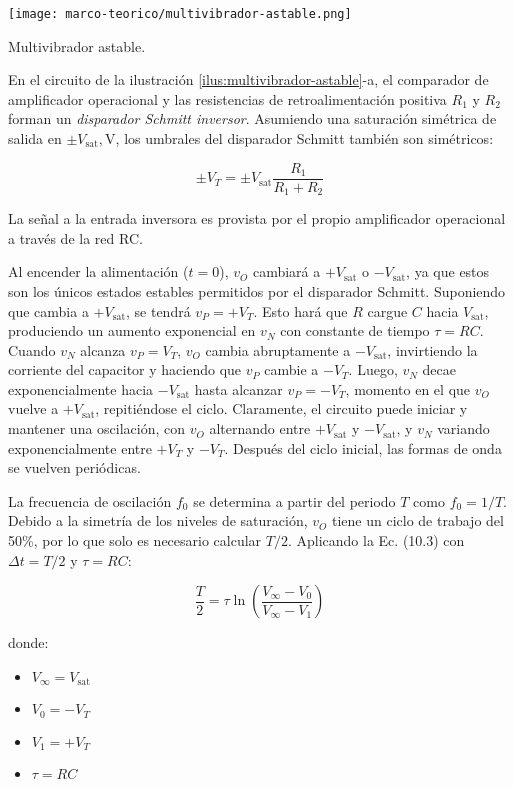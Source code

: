 \begin{ilustracion}[ht]
  \centering
  \texttt{[image: marco-teorico/multivibrador-astable.png]}
  \caption
  {Multivibrador astable.}
  \label{ilus:multivibrador-astable}
\end{ilustracion}

En el circuito de la ilustración \ref{ilus:multivibrador-astable}-a, el comparador de amplificador operacional y las resistencias de retroalimentación positiva \( R_1 \) y \( R_2 \) forman un \emph{disparador Schmitt inversor}. Asumiendo una saturación simétrica de salida en \(\pm V_{\text{sat}}, \text{V}\), los umbrales del disparador Schmitt también son simétricos:

\[
\pm V_T = \pm V_{\text{sat}} \frac{R_1}{R_1 + R_2} 
\]

La señal a la entrada inversora es provista por el propio amplificador operacional a través de la red RC.

Al encender la alimentación (\( t = 0 \)), \( v_O \) cambiará a \(+V_{\text{sat}}\) o \(-V_{\text{sat}}\), ya que estos son los únicos estados estables permitidos por el disparador Schmitt. Suponiendo que cambia a \(+V_{\text{sat}}\), se tendrá \( v_P = +V_T \). Esto hará que \( R \) cargue \( C \) hacia \( V_{\text{sat}} \), produciendo un aumento exponencial en \( v_N \) con constante de tiempo \( \tau = RC \). Cuando \( v_N \) alcanza \( v_P = V_T \), \( v_O \) cambia abruptamente a \(-V_{\text{sat}}\), invirtiendo la corriente del capacitor y haciendo que \( v_P \) cambie a \(-V_T\). Luego, \( v_N \) decae exponencialmente hacia \(-V_{\text{sat}}\) hasta alcanzar \( v_P = -V_T \), momento en el que \( v_O \) vuelve a \(+V_{\text{sat}}\), repitiéndose el ciclo. Claramente, el circuito puede iniciar y mantener una oscilación, con \( v_O \) alternando entre \(+V_{\text{sat}}\) y \(-V_{\text{sat}}\), y \( v_N \) variando exponencialmente entre \(+V_T\) y \(-V_T\). Después del ciclo inicial, las formas de onda se vuelven periódicas. \cite[pag. 492]{sergio-franco}

La frecuencia de oscilación \( f_0 \) se determina a partir del periodo \( T \) como \( f_0 = 1/T \). Debido a la simetría de los niveles de saturación, \( v_O \) tiene un ciclo de trabajo del 50\%, por lo que solo es necesario calcular \( T/2 \). Aplicando la Ec. (10.3) con \( \Delta t = T/2 \) y \( \tau = RC \):

\[
\frac{T}{2} = \tau \ln \left( \frac{V_{\infty} - V_0}{V_{\infty} - V_1} \right)
\]

donde:
\begin{itemize}
    \item \( V_{\infty} = V_{\text{sat}} \)
    \item \( V_0 = -V_T \)
    \item \( V_1 = +V_T \)
    \item \( \tau = RC \)
\end{itemize}

